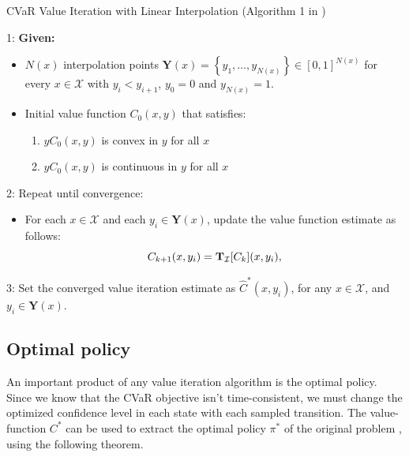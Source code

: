 \begin{algorithm}[h]
\caption{CVaR Value Iteration with Linear Interpolation (Algorithm 1 in \citep{chow2015risk})}
\label{alg:cvarlinear}
1: \textbf{Given:}
\begin{itemize}
\item $N(x)$ interpolation points $\mathbf{Y}(x)  = \left\{y_1,\dots,y_{N(x)}\right\} \in [0,1]^{N(x)}$ for every $x\in \mathcal X$ with $y_i<y_{i+1}$, $y_0=0$ and $y_{N(x)}=1$.
\item Initial value function $C_0(x,y)$ that satisfies:
\begin{enumerate}
\item $yC_0(x,y)$ is convex in $y$ for all $x$
\item $yC_0(x,y)$ is continuous in $y$ for all $x$
\end{enumerate}
\end{itemize}
2: Repeat until convergence:
\begin{itemize}
\item For each $x \in \mathcal X$ and each $y_i\in \mathbf{Y}(x)$, update the value function estimate as follows:
  \begin{equation*}
   C_{k+1}(x,y_i)= \mathbf{T}_{\mathcal{I}}[C_k](x,y_i),
  \end{equation*}
  \end{itemize}
3: Set the converged value iteration estimate as $\widehat{C}^*(x,y_i)$, for any $x\in\mathcal X$, and $ y_i\in\mathbf{Y}(x)$.
\end{algorithm}

\subsection{Optimal policy}
An important product of any value iteration algorithm is the optimal policy. Since we know that the CVaR objective isn't time-consistent, we must change the optimized confidence level in each state with each sampled transition. The value-function $C^*$ can be used to extract the optimal policy $\pi^*$ of the original problem , using the following theorem.

